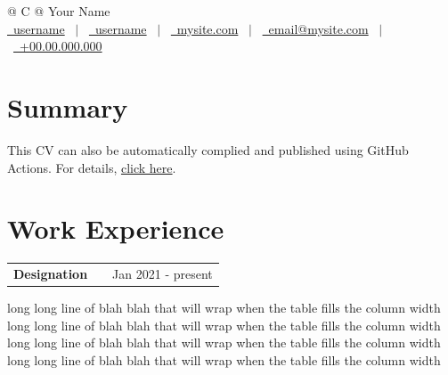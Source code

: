 \documentclass[a4paper,12pt]{article}
\makeatletter
\newenvironment{jobshort}[2]
    {
    \begin{tabularx}{\linewidth}{@{}l X r@{}}
    \textbf{#1} & \hfill &  #2 \\[3.75pt]
    \end{tabularx}
    }
    {
    }
\makeatother
\begin{document}
\pagestyle{empty} 



\begin{tabularx}{\linewidth}{@{} C @{}}
\Huge{Your Name} \\[10pts]
\href{https://github.com/username}{\raisebox{-0.05\height}\faGithub\ username} \ $|$ \ 
\href{https://linkedin.com/in/username}{\raisebox{-0.05\height}\faLinkedin\ username} \ $|$ \ 
\href{https://mysite.com}{\raisebox{-0.05\height}\faGlobe \ mysite.com} \ $|$ \ 
\href{mailto:email@mysite.com}{\raisebox{-0.05\height}\faEnvelope \ email@mysite.com} \ $|$ \ 
\href{tel:+000000000000}{\raisebox{-0.05\height}\faMobile \ +00.00.000.000} \\
\end{tabularx}


\section{Summary}
This CV can also be automatically complied and published using GitHub Actions. For details, \href{https://github.com/jitinnair1/autoCV}{click here}.

\section{Work Experience}

\begin{jobshort}{Designation}{Jan 2021 - present}
long long line of blah blah that will wrap when the table fills the column width long long line of blah blah that will wrap when the table fills the column width long long line of blah blah that will wrap when the table fills the column width long long line of blah blah that will wrap when the table fills the column width
\end{jobshort}
\end{document}
